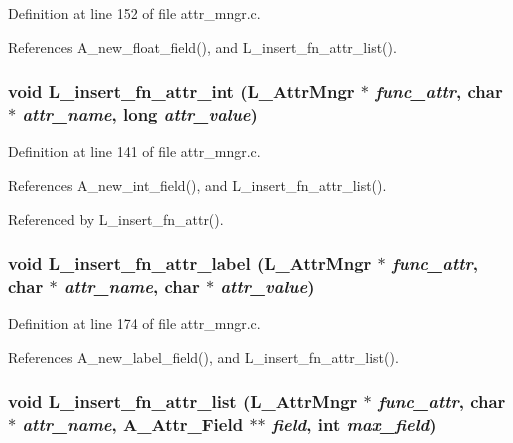 Definition at line 152 of file attr\_\-mngr.c.

References A\_\-new\_\-float\_\-field(), and L\_\-insert\_\-fn\_\-attr\_\-list().
\subsubsection{\setlength{\rightskip}{0pt plus 5cm}void L\_\-insert\_\-fn\_\-attr\_\-int (\bf{L\_\-Attr\-Mngr} $\ast$ {\em func\_\-attr}, char $\ast$ {\em attr\_\-name}, long {\em attr\_\-value})}\label{attr__mngr_8c_3b96718bf70ec42e68fa2927f8b2e0ce}




Definition at line 141 of file attr\_\-mngr.c.

References A\_\-new\_\-int\_\-field(), and L\_\-insert\_\-fn\_\-attr\_\-list().

Referenced by L\_\-insert\_\-fn\_\-attr().
\subsubsection{\setlength{\rightskip}{0pt plus 5cm}void L\_\-insert\_\-fn\_\-attr\_\-label (\bf{L\_\-Attr\-Mngr} $\ast$ {\em func\_\-attr}, char $\ast$ {\em attr\_\-name}, char $\ast$ {\em attr\_\-value})}\label{attr__mngr_8c_d6c0e3a59b2815143141579ab8362d41}




Definition at line 174 of file attr\_\-mngr.c.

References A\_\-new\_\-label\_\-field(), and L\_\-insert\_\-fn\_\-attr\_\-list().
\subsubsection{\setlength{\rightskip}{0pt plus 5cm}void L\_\-insert\_\-fn\_\-attr\_\-list (\bf{L\_\-Attr\-Mngr} $\ast$ {\em func\_\-attr}, char $\ast$ {\em attr\_\-name}, \bf{A\_\-Attr\_\-Field} $\ast$$\ast$ {\em field}, int {\em max\_\-field})}\label{attr__mngr_8c_939415af42eac998921ea7c61b19da33}




